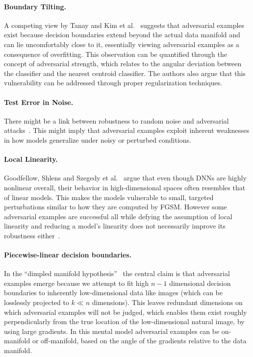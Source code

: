 \documentclass[a4paper, oneside]{discothesis}
\begin{document}
\paragraph{Boundary Tilting.} A competing view by Tanay and Kim et al.\ \cite{tanay2016boundary,kim2019bridging} suggests that adversarial examples exist because decision boundaries extend beyond the actual data manifold and can lie uncomfortably close to it, essentially viewing adversarial examples as a consequence of overfitting. This observation can be quantified through the concept of adversarial strength, which relates to the angular deviation between the classifier and the nearest centroid classifier. The authors also argue that this vulnerability can be addressed through proper regularization techniques.

\paragraph{Test Error in Noise.} There might be a link between robustness to random noise and adversarial attacks~\cite{fawzi2016robustness, lecuyer2019certified, cohen2019certified, ford2019adversarial}. This might imply that adversarial examples exploit inherent weaknesses in how models generalize under noisy or perturbed conditions.

\paragraph{Local Linearity.} Goodfellow, Shlens and Szegedy et al.\ \cite{goodfellow2014explaining, madry2017towards} argue that even though DNNs are highly nonlinear overall, their behavior in high-dimensional spaces often resembles that of linear models. This makes the models vulnerable to small, targeted perturbations similar to how they are computed by FGSM. However some adversarial examples are successful all while defying the assumption of local linearity and reducing a model's linearity does not necessarily improve its robustness either~\cite{athalye2018obfuscated}.

\paragraph{Piecewise-linear decision boundaries.} In the ``dimpled manifold hypothesis''~\cite{shamir2021dimpled} the central claim is that adversarial examples emerge because we attempt to fit high $n-1$ dimensional decision boundaries to inherently low-dimensional data like images (which can be losslessly projected to $k \ll n$ dimensions). This leaves redundant dimensions on which adversarial examples will not be judged, which enables them exist roughly perpendicularly from the true location of the low-dimensional natural image, by using large gradients. In this mental model adversarial examples can be on-manifold or off-manifold, based on the angle of the gradients relative to the data manifold.
\end{document}
